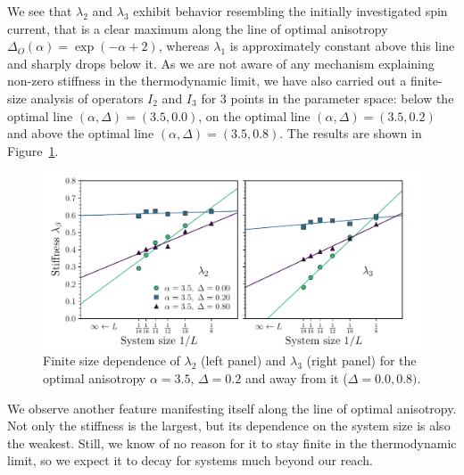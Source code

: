 We see that \(\lambda_2\) and \(\lambda_3\) exhibit behavior resembling the initially investigated spin current,
that is a clear maximum along the line of optimal anisotropy \(\Delta_{O}(\alpha) = \exp(-\alpha + 2)\),
whereas \(\lambda_1\) is approximately constant above this line and sharply drops below it.
As we are not aware of any mechanism explaining non-zero stiffness in the thermodynamic limit, we
have also carried out a finite-size analysis of operators \(I_2\) and \(I_3\) for 3 points in the parameter space:
below the optimal line \((\alpha,\Delta) = (3.5,0.0)\), on the optimal line \((\alpha,\Delta) = (3.5,0.2)\) and
above the optimal line \((\alpha,\Delta) = (3.5,0.8)\). The results are shown in Figure~\ref{fig:stiffness_finite_size}.


\begin{figure}[htbp]
  \centering
  \includegraphics[width=0.8\linewidth]{Figures/finite_size.pdf}
  \caption{Finite size dependence of \(\lambda_2\) (left panel) and \(\lambda_3\) (right panel) for the
    optimal anisotropy \(\alpha = 3.5\), \(\Delta = 0.2\) and away from it (\(\Delta = 0.0,0.8)\).}
  \label{fig:stiffness_finite_size}
\end{figure}
We observe another feature manifesting itself along the line of optimal anisotropy. Not only
the stiffness is the largest, but its dependence on the system size is also the weakest. Still,
we know of no reason for it to stay finite in the thermodynamic limit, so we expect it to
decay for systems much beyond our reach.


